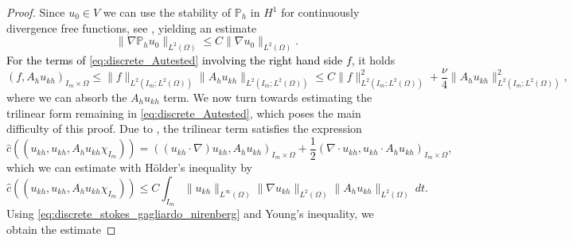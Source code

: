 \documentclass{m2an}
\newcommand\blue[1]{\textcolor{black}{#1}}
\newcommand{\ImOprod}[1]{\left( #1 \right)_{I_m\times\Omega}}
\newcommand{\Oprod}[1]{\left( #1 \right)_{\Omega}}
\newcommand{\chatIO}[1]{\hat c \left(\!\left( #1 \right)\!\right)}
\newcommand{\ukh}{u_{kh}}
\newcommand{\Ph}{\mathbb P_h}
\begin{document}
\begin{proof}
{Since $u_0 \in V$ we can use the stability of $\Ph$ in $H^1$ for continuously divergence free functions,
see \cite[Lemma 5.4]{vexler_l2i_2023}, yielding an estimate 
\begin{equation}\label{eq:inititial_data_projection_stability}
\|\nabla \Ph u_0\|_{L^2(\Omega)} \le C\|\nabla u_0\|_{L^2(\Omega)}.
\end{equation}
}
\blue{For the terms of \eqref{eq:discrete_Autested} involving the right hand side $f$}, it holds
\begin{equation*}
   \ImOprod{f,A_h \ukh} \le \|f\|_{L^2(I_m;L^2(\Omega))}\|A_h \ukh\|_{L^2(I_m;L^2(\Omega))}
   \le C \|f\|_{L^2(I_m;L^2(\Omega))}^2 + \frac{\nu}{4} \|A_h \ukh\|_{L^2(I_m;L^2(\Omega))}^2,
\end{equation*}
where we can absorb the $A_h \ukh$ term.
We now turn towards estimating the trilinear form remaining in \eqref{eq:discrete_Autested},
which poses the main difficulty of this proof.
Due to , the trilinear term satisfies the expression
\begin{equation*}
   \chatIO{\ukh,\ukh,A_h \ukh \chi_{I_m}} = \ImOprod{(\ukh \cdot \nabla)\ukh,A_h \ukh} 
   + \frac{1}{2} \ImOprod{\nabla \cdot \ukh,\ukh \cdot A_h \ukh},
\end{equation*}
which we can estimate with Hölder's inequality by
\begin{equation*}
   \chatIO{\ukh,\ukh,A_h \ukh \chi_{I_m}} \le C
   \int_{I_m} \|\ukh\|_{L^\infty(\Omega)} \|\nabla \ukh\|_{L^2(\Omega)} \|A_h \ukh\|_{L^2(\Omega)} \ dt.
\end{equation*}
Using \eqref{eq:discrete_stokes_gagliardo_nirenberg} and Young's inequality, we obtain the estimate

\end{proof}
\end{document}
